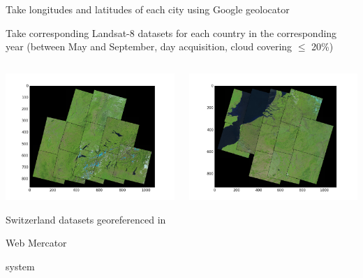 \documentclass[c]{beamer}
\begin{document}
\begin{frame}
\begin{itemize}
{\begin{columns}
 \end{columns}
 \item Take longitudes and latitudes of each city using Google geolocator
 \item Take corresponding Landsat-8 datasets for each country in the corresponding year (between May and September, day acquisition, cloud covering $\leq$ 20\%)
 \begin{columns}
  \begin{column}{0.33\textwidth}
  \begin{overlayarea}{\linewidth}{3cm}
    \centering\vfill
    \includegraphics[scale=0.20]{images/Switzerland/covering-selection.png}
  \end{overlayarea}
  \begin{overlayarea}{\linewidth}{1cm}
    \centering
    \tiny Switzerland datasets georeferenced in \begin{itshape}Web Mercator\end{itshape} system\par
  \end{overlayarea}
  \end{column}
  \begin{column}{0.33\textwidth}
   \begin{overlayarea}{\linewidth}{3cm}
    \centering\vfill
    \includegraphics[scale=0.20]{images/Belgium/covering-selection.png}

\end{overlayarea}
\end{column}
\end{columns}}
\end{itemize}
\end{frame}
\end{document}
